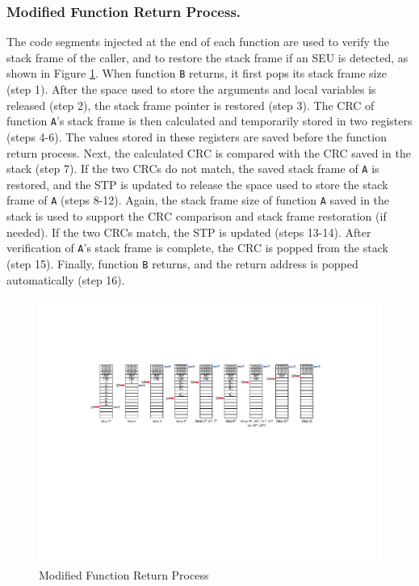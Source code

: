 \subsubsection{Modified Function Return Process.}
The code segments injected at the end of each function are used to verify the stack frame of the caller, and to restore the stack frame if an SEU is detected, as shown in Figure \ref{fig:modified_function_operation_post_execution}. When function \texttt{B} returns, it first pops its stack frame size (step 1). After the space used to store the arguments and local variables is released (step 2), the stack frame pointer is restored (step 3). The CRC of function \texttt{A}'s stack frame is then calculated and temporarily stored in two registers (steps 4-6). The values stored in these registers are saved before the function return process. Next, the calculated CRC is compared with the CRC saved in the stack (step 7). If the two CRCs do not match, the saved stack frame of \texttt{A} is restored, and the STP is updated to release the space used to store the stack frame of \texttt{A} (steps 8-12). Again, the stack frame size of function \texttt{A} saved in the stack is used to support the CRC comparison and stack frame restoration (if needed). If the two CRCs match, the STP is updated (steps 13-14). After verification of \texttt{A}'s stack frame is complete, the CRC is popped from the stack (step 15). Finally, function \texttt{B} returns, and the return address is popped automatically (step 16).
\vspace{-20pt}
\begin{figure}
	\centering
	\includegraphics[width=1.0\textwidth]{figures/modified_function_operations_stack_post_execution_v3}
	\vspace{-20pt}
	\caption{Modified Function Return Process}\label{fig:modified_function_operation_post_execution}
\end{figure}
\vspace{-25pt}
